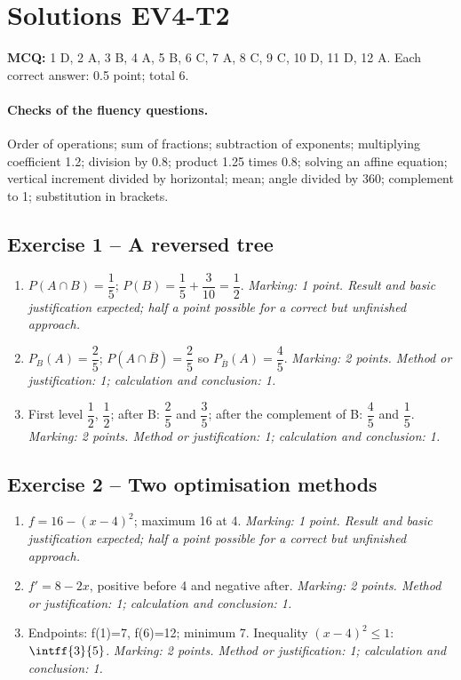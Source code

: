\mxnewpage\section*{Solutions EV4-T2}\label{EV4-T2-CORR}
\textbf{MCQ:} 1 D, 2 A, 3 B, 4 A, 5 B, 6 C, 7 A, 8 C, 9 C, 10 D, 11 D, 12 A. Each correct answer: \num{0,5} point; total 6.
\paragraph{Checks of the fluency questions.} Order of operations; sum of fractions; subtraction of exponents; multiplying coefficient \num{1,2}; division by \num{0,8}; product \num{1,25} times \num{0,8}; solving an affine equation; vertical increment divided by horizontal; mean; angle divided by 360; complement to 1; substitution in brackets.
\subsection*{Exercise 1 -- A reversed tree}
\begin{enumerate}
\item $P(A\cap B)=\dfrac{1}{5}$; $P(B)=\dfrac{1}{5}+\dfrac{3}{10}=\dfrac{1}{2}$. \textit{Marking: 1 point. Result and basic justification expected; half a point possible for a correct but unfinished approach.}
\item $P_B(A)=\dfrac{2}{5}$; $P(A\cap\overline B)=\dfrac{2}{5}$ so $P_{\overline B}(A)=\dfrac{4}{5}$. \textit{Marking: 2 points. Method or justification: 1; calculation and conclusion: 1.}
\item First level $\dfrac{1}{2}$, $\dfrac{1}{2}$; after B: $\dfrac{2}{5}$ and $\dfrac{3}{5}$; after the complement of B: $\dfrac{4}{5}$ and $\dfrac{1}{5}$. \textit{Marking: 2 points. Method or justification: 1; calculation and conclusion: 1.}
\end{enumerate}
\subsection*{Exercise 2 -- Two optimisation methods}
\begin{enumerate}
\item $f=16-(x-4)^2$; maximum 16 at 4. \textit{Marking: 1 point. Result and basic justification expected; half a point possible for a correct but unfinished approach.}
\item $f\prime=8-2x$, positive before 4 and negative after. \textit{Marking: 2 points. Method or justification: 1; calculation and conclusion: 1.}
\item Endpoints: f(1)=7, f(6)=12; minimum 7. Inequality $(x-4)^2\leq1$: $\intff{3}{5}$. \textit{Marking: 2 points. Method or justification: 1; calculation and conclusion: 1.}
\end{enumerate}
